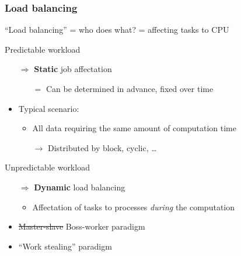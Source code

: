 \documentclass[xcolor={rgb,x11names,svgnames},rgb,x11names,svgnames]{beamer}
\begin{document}
\begin{frame}
  \frametitle{Load balancing}

  ``Load balancing'' = who does what? = affecting tasks to CPU
  
  \begin{exampleblock}{Predictable workload}
    \begin{itemize}
    \item[$\Rightarrow$] \textbf{Static} job affectation
      \begin{itemize}
      \item[$=$] Can be determined in advance, fixed over time
      \end{itemize}
      
    \item Typical scenario: 
      \begin{itemize}
      \item All data requiring the same amount of computation time
      \item[$\rightarrow$] Distributed by block, cyclic, \dots
      \end{itemize}
    \end{itemize}
  \end{exampleblock}
  
  \medskip
  
  \begin{alertblock}{Unpredictable workload}
    \begin{itemize}
    \item[$\Rightarrow$] \textbf{Dynamic} load balancing
      \begin{itemize}
      \item Affectation of tasks to processes \emph{during} the computation
      \end{itemize}
    \item \sout{Master-slave} Boss-worker paradigm
    \item ``Work stealing'' paradigm
    \end{itemize}
  \end{alertblock}
\end{frame}
\end{document}
